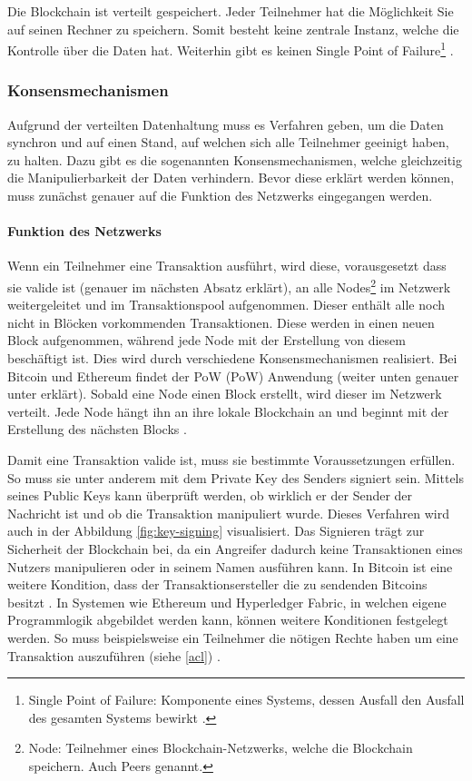Die Blockchain ist verteilt gespeichert. Jeder Teilnehmer hat die Möglichkeit Sie auf seinen Rechner zu speichern. Somit besteht keine zentrale Instanz, welche die Kontrolle über die Daten hat. Weiterhin gibt es keinen Single Point of Failure\footnote{Single Point of Failure: Komponente eines Systems, dessen Ausfall den Ausfall des gesamten Systems bewirkt \cite{KshetriCanBlockchainStrengthen2017}.} \cite{KshetriCanBlockchainStrengthen2017}.

\label{subsec:konsens}
\subsubsection{Konsensmechanismen}
Aufgrund der verteilten Datenhaltung muss es Verfahren geben, um die Daten synchron und auf einen Stand, auf welchen sich alle Teilnehmer geeinigt haben, zu halten. Dazu gibt es die sogenannten Konsensmechanismen, welche gleichzeitig die Manipulierbarkeit der Daten verhindern. Bevor diese erklärt werden können, muss zunächst genauer auf die Funktion des Netzwerks eingegangen werden.

\paragraph{Funktion des Netzwerks}
Wenn ein Teilnehmer eine Transaktion ausführt, wird diese, vorausgesetzt dass sie valide ist (genauer im nächsten Absatz erklärt), an alle Nodes\footnote{Node: Teilnehmer eines Blockchain-Netzwerks, welche die Blockchain speichern. Auch Peers genannt.} im Netzwerk weitergeleitet und im Transaktionspool aufgenommen. Dieser enthält alle noch nicht in Blöcken vorkommenden Transaktionen. Diese werden in einen neuen Block aufgenommen, während jede Node mit der Erstellung von diesem beschäftigt ist. Dies wird durch verschiedene Konsensmechanismen realisiert. Bei Bitcoin und Ethereum findet der \acl{PoW} (\acs{PoW}) Anwendung (weiter unten genauer unter erklärt). Sobald eine Node einen Block erstellt, wird dieser im Netzwerk verteilt. Jede Node hängt ihn an ihre lokale Blockchain an und beginnt mit der Erstellung des nächsten Blocks \cite[S.~200 ff.]{AntonopoulosMasteringbitcoin2015}.

Damit eine Transaktion valide ist, muss sie bestimmte Voraussetzungen erfüllen. So muss sie unter anderem mit dem Private Key des Senders signiert sein. Mittels seines Public Keys kann überprüft werden, ob wirklich er der Sender der Nachricht ist und ob die Transaktion manipuliert wurde. Dieses Verfahren wird auch in der Abbildung \ref{fig:key-signing} visualisiert. Das Signieren trägt zur Sicherheit der Blockchain bei, da ein Angreifer dadurch keine Transaktionen eines Nutzers manipulieren oder in seinem Namen ausführen kann. In Bitcoin ist eine weitere Kondition, dass der Transaktionsersteller die zu sendenden Bitcoins besitzt \cite[S.~18]{AntonopoulosMasteringbitcoin2015}. In Systemen wie Ethereum und Hyperledger Fabric, in welchen eigene Programmlogik abgebildet werden kann, können weitere Konditionen festgelegt werden. So muss beispielsweise ein Teilnehmer die nötigen Rechte haben um eine Transaktion auszuführen (siehe \ref{acl}) \cite{HyperledgerComposerTeamAccessControlLanguage}.

